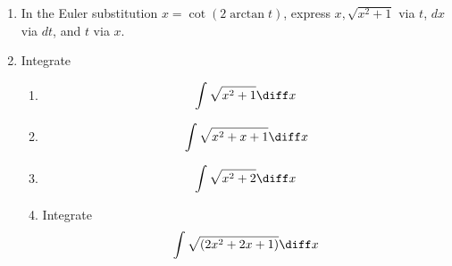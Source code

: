 \begin{enumerate}
\item In the Euler substitution $x=\cot (2\arctan t)$, express  $x,\sqrt{x^2+1} $ via $t$, $dx$ via $dt$, and $t$ via $x$.
\item Integrate
\begin{enumerate}
\item 
\[
\int \sqrt{x^2+1}\diff x
\]
\item 
\[
\int \sqrt{x^2+x+1}\diff x
\]
\item 
\[
\int \sqrt{x^2+2}\diff x
\]
\item 
Integrate 
\[
\int \sqrt{\left(2x^2+2x+1\right)}\diff x
\]

\end{enumerate}
\end{enumerate}
